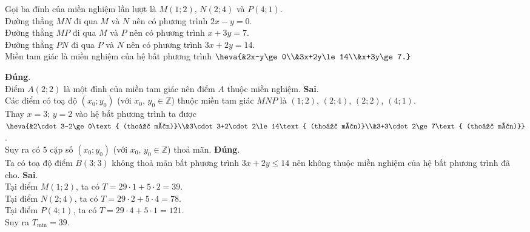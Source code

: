 \begin{ex}
{\begin{center}
		\end{center}
		Gọi ba đỉnh của miền nghiệm lần lượt là $M(1;2)$, $N(2;4)$ và $P(4;1)$.\\
		Đường thẳng $MN$ đi qua $M$ và $N$ nên có phương trình $2x-y=0$.\\
		Đường thẳng $MP$ đi qua $M$ và $P$ nên có phương trình $x+3y=7$.\\
		Đường thẳng $PN$ đi qua $P$ và $N$ nên có phương trình $3x+2y=14$.\\
		Miền tam giác là miền nghiệm của hệ bất phương trình $\heva{&2x-y\ge0\\&3x+2y\le14\\&x+3y\ge7.}$
		\begin{itemchoice}
			\itemch \textbf{Đúng}.\\
			Điểm $A(2;2)$ là một đỉnh của miền tam giác nên điểm $A$  thuộc miền nghiệm.
			\itemch \textbf{Sai}.\\
			Các điểm có toạ độ $\left(x_0;y_0\right)$ (với $x_0$, $y_0\in\mathbb{Z}$) thuộc miền tam giác $MNP$ là $(1;2)$, $(2;4)$, $(2;2)$, $(4;1)$.\\
			Thay $x=3;\,y=2$ vào hệ bất phương trình ta được  $\heva{&2\cdot3-2\ge0\text{ (thoả mãn)}\\&3\cdot3+2\cdot2\le14\text{ (thoả mãn)}\\&3+3\cdot2\ge7\text{ (thoả mãn)}}$.\\
			Suy ra có $5$ cặp số $\left(x_0;y_0\right)$ (với $x_0$, $y_0\in\mathbb{Z}$) thoả mãn.
			\itemch \textbf{Đúng}.\\
			Ta có toạ độ điểm $B(3;3)$ không thoả mãn bất phương trình $3x+2y\le14$ nên không thuộc miền nghiệm của hệ bất phương trình đã cho.
			\itemch \textbf{Sai}.\\
			Tại điểm $M(1;2)$, ta có $T=29\cdot1+5\cdot2=39$.\\
			Tại điểm $N(2;4)$, ta có $T=29\cdot2+5\cdot4=78$.\\
			Tại điểm $P(4;1)$, ta có $T=29\cdot4+5\cdot1=121$.\\
			Suy ra $T_{\min}=39$.
		\end{itemchoice}	
	}
\end{ex}

